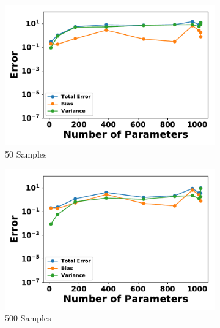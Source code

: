\documentclass[letterpaper]{article} %
\begin{document}
        \begin{figure}[p]
          \centering
          \begin{subfigure}[b]{0.245\textwidth}
              \centering
              \includegraphics[width=\textwidth]{./HBM_Error_vs_Order_Samples50-eps-converted-to.pdf}
              \caption{50 Samples}
          \end{subfigure}
          \begin{subfigure}[b]{0.245\textwidth}
              \centering
              \includegraphics[width=\textwidth]{./HBM_Error_vs_Order_Samples500-eps-converted-to.pdf}
              \caption{500 Samples}
          \end{subfigure}
          \begin{subfigure}[b]{0.245\textwidth}
              \centering

\end{subfigure}
\end{figure}
\end{document}
